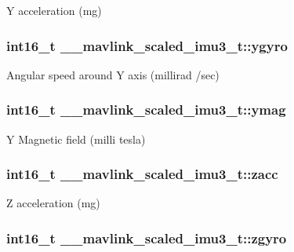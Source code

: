Y acceleration (mg) 

\hypertarget{struct____mavlink__scaled__imu3__t_a5a3a285ac25b5267987d314890a4c5b1}{
\subsubsection[{ygyro}]{\setlength{\rightskip}{0pt plus 5cm}int16\+\_\+t \+\_\+\+\_\+mavlink\+\_\+scaled\+\_\+imu3\+\_\+t\+::ygyro}}\label{struct____mavlink__scaled__imu3__t_a5a3a285ac25b5267987d314890a4c5b1}


Angular speed around Y axis (millirad /sec) 

\hypertarget{struct____mavlink__scaled__imu3__t_a805f83b854058bc1cabd0bf2ca616795}{
\subsubsection[{ymag}]{\setlength{\rightskip}{0pt plus 5cm}int16\+\_\+t \+\_\+\+\_\+mavlink\+\_\+scaled\+\_\+imu3\+\_\+t\+::ymag}}\label{struct____mavlink__scaled__imu3__t_a805f83b854058bc1cabd0bf2ca616795}


Y Magnetic field (milli tesla) 

\hypertarget{struct____mavlink__scaled__imu3__t_ab68d15d82dc70c7c085da5dfcbec8345}{
\subsubsection[{zacc}]{\setlength{\rightskip}{0pt plus 5cm}int16\+\_\+t \+\_\+\+\_\+mavlink\+\_\+scaled\+\_\+imu3\+\_\+t\+::zacc}}\label{struct____mavlink__scaled__imu3__t_ab68d15d82dc70c7c085da5dfcbec8345}


Z acceleration (mg) 

\hypertarget{struct____mavlink__scaled__imu3__t_a67cb6428c59de4b6e5ba0401d5cd8993}{
\subsubsection[{zgyro}]{\setlength{\rightskip}{0pt plus 5cm}int16\+\_\+t \+\_\+\+\_\+mavlink\+\_\+scaled\+\_\+imu3\+\_\+t\+::zgyro}}\label{struct____mavlink__scaled__imu3__t_a67cb6428c59de4b6e5ba0401d5cd8993}


